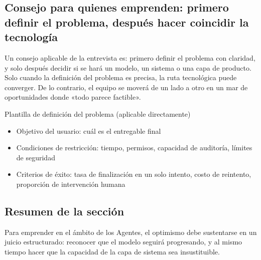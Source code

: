 \subsection{Consejo para quienes emprenden: primero definir el problema, después hacer coincidir la tecnología}

Un consejo aplicable de la entrevista es: primero definir el problema con claridad, y solo después decidir si se hará un modelo, un sistema o una capa de producto. Solo cuando la definición del problema es precisa, la ruta tecnológica puede converger. De lo contrario, el equipo se moverá de un lado a otro en un mar de oportunidades donde «todo parece factible».

\begin{knowledgebox}{Plantilla de definición del problema (aplicable directamente)}
\begin{itemize}
    \item Objetivo del usuario: cuál es el entregable final
    \item Condiciones de restricción: tiempo, permisos, capacidad de auditoría, límites de seguridad
    \item Criterios de éxito: tasa de finalización en un solo intento, costo de reintento, proporción de intervención humana
\end{itemize}
\end{knowledgebox}

\subsection{Resumen de la sección}

Para emprender en el ámbito de los Agentes, el optimismo debe sustentarse en un juicio estructurado: reconocer que el modelo seguirá progresando, y al mismo tiempo hacer que la capacidad de la capa de sistema sea insustituible.

